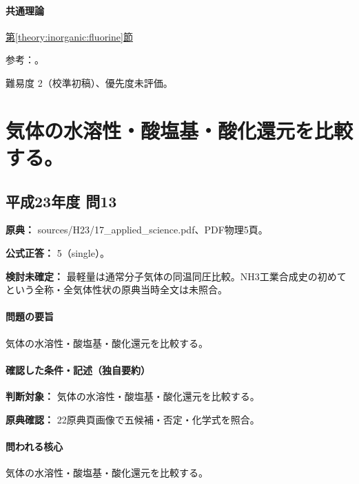 \paragraph{共通理論} \hyperref[theory:inorganic:fluorine]{第\ref*{theory:inorganic:fluorine}節}

\par 参考：\cite{inorganic_metalloid_ref,inorganic_hf_etch,inorganic_ptfe}。

\par 難易度 2（校準初稿）、優先度未評価。

\section{気体の水溶性・酸塩基・酸化還元を比較する。}

\subsection{平成23年度 問13}
\label{q:h23-reg-applied-13}

\noindent\textbf{原典：} sources/H23/17\_applied\_science.pdf、PDF物理5頁。

\textbf{公式正答：} 5（single）。

\par\textbf{検討未確定：} 最軽量は通常分子気体の同温同圧比較。NH3工業合成史の初めてという全称・全気体性状の原典当時全文は未照合。

\paragraph{問題の要旨} 気体の水溶性・酸塩基・酸化還元を比較する。

\paragraph{確認した条件・記述（独自要約）}\mbox{}\par

\noindent\textbf{判断対象：} 気体の水溶性・酸塩基・酸化還元を比較する。\par

\noindent\textbf{原典確認：} 22原典頁画像で五候補・否定・化学式を照合。\par

\paragraph{問われる核心} 気体の水溶性・酸塩基・酸化還元を比較する。

